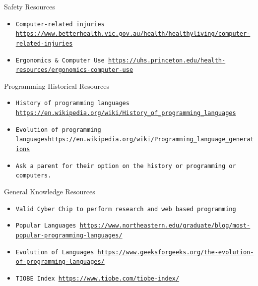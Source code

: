 \documentclass[10pt]{beamer}
\begin{document}
{\begin{frame}{Safety Resources}{}
\begin{block}{}
  \begin{itemize}
    \item {\tt Computer-related injuries \url{https://www.betterhealth.vic.gov.au/health/healthyliving/computer-related-injuries}}
    \item {\tt Ergonomics \& Computer Use \url{https://uhs.princeton.edu/health-resources/ergonomics-computer-use}}
    \end{itemize}
  \end{block}
\end{frame}


\begin{frame}{Programming Historical Resources}{}
  \begin{block}{}
    \begin{itemize}
      \item {\tt History of programming languages \url{https://en.wikipedia.org/wiki/History_of_programming_languages}}
      \item {\tt Evolution of programming languages\url{https://en.wikipedia.org/wiki/Programming_language_generations}}
      \item {\tt Ask a parent for their option on the history or programming or computers.}
    \end{itemize}
  \end{block}
\end{frame}


\begin{frame}{General Knowledge Resources}{}
\begin{block}{}
  \begin{itemize}
    \item {\tt Valid Cyber Chip to perform research and web based programming}
    \item {\tt Popular Languages \url{https://www.northeastern.edu/graduate/blog/most-popular-programming-languages/}}
    \item {\tt Evolution of Languages \url{https://www.geeksforgeeks.org/the-evolution-of-programming-languages/}}
    \item {\tt TIOBE Index \url{https://www.tiobe.com/tiobe-index/}}
    \end{itemize}
  \end{block}
\end{frame}

}
\end{document}
